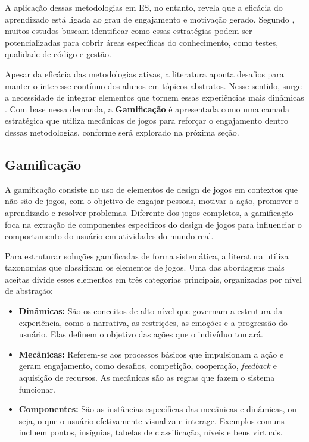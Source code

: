 \documentclass[12pt,openright,oneside,a4paper,brazil]{abntex2}
\begin{document}
A aplicação dessas metodologias em ES, no entanto, revela que a eficácia do aprendizado está ligada ao grau de engajamento e motivação gerado. Segundo \cite{TONHAO2023}, muitos estudos buscam identificar como essas estratégias podem ser potencializadas para cobrir áreas específicas do conhecimento, como testes, qualidade de código e gestão.

Apesar da eficácia das metodologias ativas, a literatura aponta desafios para manter o interesse contínuo dos alunos em tópicos abstratos. Nesse sentido, surge a necessidade de integrar elementos que tornem essas experiências mais dinâmicas \cite{Lampropoulos2024}. Com base nessa demanda, a \textbf{Gamificação} é apresentada como uma camada estratégica que utiliza mecânicas de jogos para reforçar o engajamento dentro dessas metodologias, conforme será explorado na próxima seção.

\subsection{Gamificação}

A gamificação consiste no uso de elementos de design de jogos em contextos que não são de jogos, com o objetivo de engajar pessoas, motivar a ação, promover o aprendizado e resolver problemas. Diferente dos jogos completos, a gamificação foca na extração de componentes específicos do design de jogos para influenciar o comportamento do usuário em atividades do mundo real.

Para estruturar soluções gamificadas de forma sistemática, a literatura utiliza taxonomias que classificam os elementos de jogos. Uma das abordagens mais aceitas divide esses elementos em três categorias principais, organizadas por nível de abstração:

\begin{itemize}
    \item \textbf{Dinâmicas:} São os conceitos de alto nível que governam a estrutura da experiência, como a narrativa, as restrições, as emoções e a progressão do usuário. Elas definem o objetivo das ações que o indivíduo tomará.
    \item \textbf{Mecânicas:} Referem-se aos processos básicos que impulsionam a ação e geram engajamento, como desafios, competição, cooperação, \textit{feedback} e aquisição de recursos. As mecânicas são as regras que fazem o sistema funcionar.
    \item \textbf{Componentes:} São as instâncias específicas das mecânicas e dinâmicas, ou seja, o que o usuário efetivamente visualiza e interage. Exemplos comuns incluem pontos, insígnias, tabelas de classificação, níveis e bens virtuais.
\end{itemize}
\end{document}
